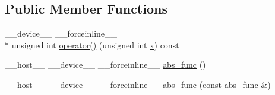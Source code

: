 \subsection*{Public Member Functions}
\begin{DoxyCompactItemize}
\item 
\-\_\-\-\_\-device\-\_\-\-\_\- \-\_\-\-\_\-forceinline\-\_\-\-\_\- \\*
unsigned int \hyperlink{structcv_1_1gpu_1_1device_1_1abs__func_3_01unsigned_01int_01_4_a4fe2ad8d7704a42204c8fbacd858f5e4}{operator()} (unsigned int \hyperlink{highgui__c_8h_a6150e0515f7202e2fb518f7206ed97dc}{x}) const 
\item 
\-\_\-\-\_\-host\-\_\-\-\_\- \-\_\-\-\_\-device\-\_\-\-\_\- \-\_\-\-\_\-forceinline\-\_\-\-\_\- \hyperlink{structcv_1_1gpu_1_1device_1_1abs__func_3_01unsigned_01int_01_4_a187651b53a4595c1ff90c18831808828}{abs\-\_\-func} ()
\item 
\-\_\-\-\_\-host\-\_\-\-\_\- \-\_\-\-\_\-device\-\_\-\-\_\- \-\_\-\-\_\-forceinline\-\_\-\-\_\- \hyperlink{structcv_1_1gpu_1_1device_1_1abs__func_3_01unsigned_01int_01_4_ae013ed2338548d0c753e80e7a9e90675}{abs\-\_\-func} (const \hyperlink{structcv_1_1gpu_1_1device_1_1abs__func}{abs\-\_\-func} \&)
\end{DoxyCompactItemize}


